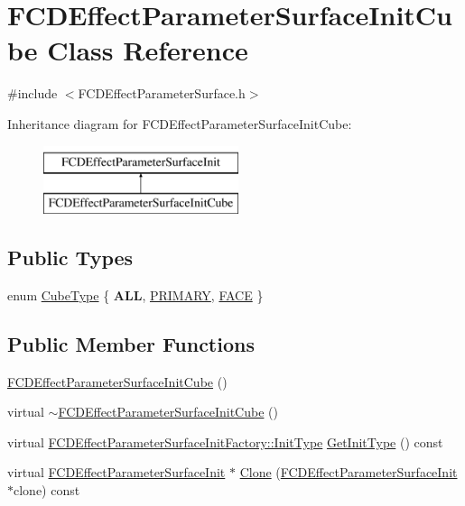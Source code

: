 \hypertarget{classFCDEffectParameterSurfaceInitCube}{
\section{FCDEffectParameterSurfaceInitCube Class Reference}
\label{classFCDEffectParameterSurfaceInitCube}
}


{\ttfamily \#include $<$FCDEffectParameterSurface.h$>$}

Inheritance diagram for FCDEffectParameterSurfaceInitCube:\begin{figure}[H]
\begin{center}
\leavevmode
\includegraphics[height=2.000000cm]{classFCDEffectParameterSurfaceInitCube}
\end{center}
\end{figure}
\subsection*{Public Types}
\begin{DoxyCompactItemize}
\item 
enum \hyperlink{classFCDEffectParameterSurfaceInitCube_a59228097e934d37b9e8ae788a749bc07}{CubeType} \{ {\bfseries ALL}, 
\hyperlink{classFCDEffectParameterSurfaceInitCube_a59228097e934d37b9e8ae788a749bc07a5f20c13bdba2e0c6acd3616d3af70936}{PRIMARY}, 
\hyperlink{classFCDEffectParameterSurfaceInitCube_a59228097e934d37b9e8ae788a749bc07ad8ea23e52036e6ad637a7169021239f3}{FACE}
 \}
\end{DoxyCompactItemize}
\subsection*{Public Member Functions}
\begin{DoxyCompactItemize}
\item 
\hyperlink{classFCDEffectParameterSurfaceInitCube_ae55fc2856c67f2572dc5eb26cdafda76}{FCDEffectParameterSurfaceInitCube} ()
\item 
virtual \hyperlink{classFCDEffectParameterSurfaceInitCube_ad69a070147d26f23d81d4380c9dd6ec8}{$\sim$FCDEffectParameterSurfaceInitCube} ()
\item 
virtual \hyperlink{classFCDEffectParameterSurfaceInitFactory_a65e74f1159865702cac5236dd5d83892}{FCDEffectParameterSurfaceInitFactory::InitType} \hyperlink{classFCDEffectParameterSurfaceInitCube_aa22db1c4680d97b447466bc54a492451}{GetInitType} () const 
\item 
virtual \hyperlink{classFCDEffectParameterSurfaceInit}{FCDEffectParameterSurfaceInit} $\ast$ \hyperlink{classFCDEffectParameterSurfaceInitCube_a46ae1522ddb60038c59f9a1511157713}{Clone} (\hyperlink{classFCDEffectParameterSurfaceInit}{FCDEffectParameterSurfaceInit} $\ast$clone) const 
\end{DoxyCompactItemize}
